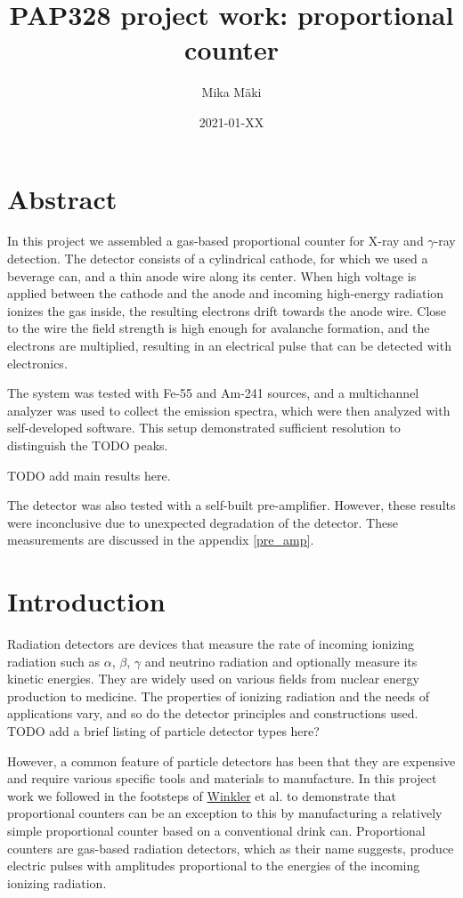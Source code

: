 \documentclass[a4paper]{article}
\title{PAP328 project work: proportional counter}
\author{Mika Mäki}
\date{2021-01-XX}
\begin{document}
\maketitle

\section*{Abstract}
In this project we assembled a gas-based proportional counter for X-ray and $\gamma$-ray detection.
The detector consists of a cylindrical cathode, for which we used a beverage can, and a thin anode wire along its center.
When high voltage is applied between the cathode and the anode and incoming high-energy radiation ionizes the gas inside, the resulting electrons drift towards the anode wire.
Close to the wire the field strength is high enough for avalanche formation, and the electrons are multiplied, resulting in an electrical pulse that can be detected with electronics.

The system was tested with Fe-55 and Am-241 sources, and a multichannel analyzer was used to collect the emission spectra, which were then analyzed with self-developed software.
This setup demonstrated sufficient resolution to distinguish the TODO peaks.

TODO add main results here.

The detector was also tested with a self-built pre-amplifier.
However, these results were inconclusive due to unexpected degradation of the detector.
These measurements are discussed in the appendix \ref{pre_amp}.

\tableofcontents


\section{Introduction}
\label{introduction}
Radiation detectors are devices that measure the rate of incoming ionizing radiation such as $\alpha$, $\beta$, $\gamma$ and neutrino radiation and optionally measure its kinetic energies.
They are widely used on various fields from nuclear energy production to medicine.
The properties of ionizing radiation and the needs of applications vary, and so do the detector principles and constructions used.
TODO add a brief listing of particle detector types here?

However, a common feature of particle detectors has been that they are expensive and require various specific tools and materials to manufacture.
In this project work we followed in the footsteps of
\href{https://www.helsinki.fi/en/people/people-finder/alexander-winkler-9110087}{Winkler}
et al. \cite{winkler_gaseous_2015} to demonstrate that proportional counters can be an exception to this by manufacturing a relatively simple proportional counter based on a conventional drink can.
Proportional counters are gas-based radiation detectors, which as their name suggests, produce electric pulses with amplitudes proportional to the energies of the incoming ionizing radiation.
\end{document}
